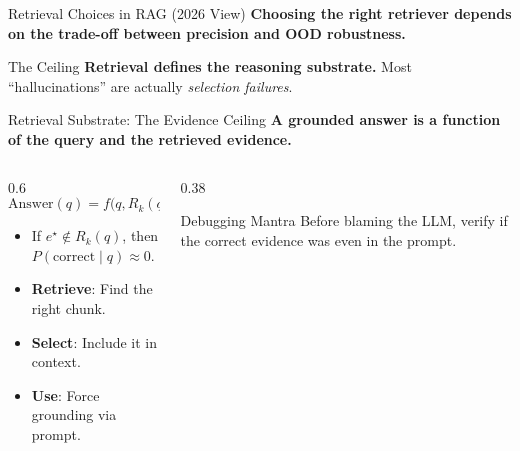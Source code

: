 \documentclass[aspectratio=169, xcolor=table]{beamer}
\newif\ifanimated
\newcommand{\cpause}{\ifanimated\pause\fi}
\begin{document}
\begin{frame}[plain]
\sectionpage
\end{frame}

\begin{frame}{Retrieval Choices in RAG (2026 View)}
\textbf{Choosing the right retriever depends on the trade-off between precision and OOD robustness.}

\vspace{0.8em}
\begin{table}
\centering
{}
\end{table}

\cpause
\vspace{0.2em}
\begin{alertblock}{The Ceiling}
\textbf{Retrieval defines the reasoning substrate.} Most ``hallucinations'' are actually \emph{selection failures}.
\end{alertblock}
\end{frame}

\begin{frame}{Retrieval Substrate: The Evidence Ceiling}
\textbf{A grounded answer is a function of the query and the retrieved evidence.}

\vspace{1em}
\begin{columns}
\begin{column}{0.6\textwidth}
\[ \text{Answer}(q) = f\big(q, R_k(q)\big) \]
\cpause
\begin{itemize}
    \item If $e^\star \notin R_k(q)$, then $P(\text{correct} \mid q) \approx 0$.
    \item \textbf{Retrieve}: Find the right chunk.
    \item \textbf{Select}: Include it in context.
    \item \textbf{Use}: Force grounding via prompt.
\end{itemize}
\end{column}
\begin{column}{0.38\textwidth}
\begin{alertblock}{Debugging Mantra}
Before blaming the LLM, verify if the correct evidence was even in the prompt.
\end{alertblock}
\end{column}
\end{columns}
\end{frame}
\end{document}
